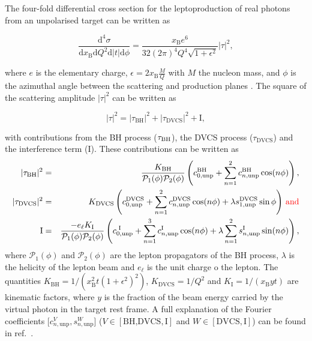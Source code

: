 The four-fold differential cross section for the leptoproduction of real photons
from an unpolarised target can be written as \cite{Bel02b}
\begin{center}
\begin{equation}
\frac{\textrm{d}^4\sigma}{\textrm{d}x_{\textrm{B}}\textrm{d}Q^{2}\textrm{d}
|t|\textrm{d}\phi} =
\frac{x_{\textrm{B}}e^{6}}{32(2\pi)^{4} Q^{4}\sqrt{1+\epsilon^{2}}}
|\tau|^{2},
\end{equation}
\end{center}
where $e$ is the elementary
charge, $\epsilon=2x_\textrm{B}\frac{M}{Q}$ with $M$
the nucleon mass, and $\phi$ is the
azimuthal angle between the scattering and production planes \cite{Tre04}.
The {square of the} scattering amplitude $|\tau|^2$ can be written as
\begin{center}
\begin{equation}
|\tau|^{2} = |\tau_{\textrm{BH}}|^{2} +
|\tau_{\textrm{DVCS}}|^{2} + \textrm{I},
\end{equation}
\end{center}
with contributions from the \textrm{BH} process ($\tau_{\textrm{\textrm{BH}}}$),
the DVCS process
($\tau_{\textrm{DVCS}}$) and the interference term (I). These
contributions can be written as
\begin{eqnarray}
 |\tau_{\textrm{BH}}|^{2} &=&
 \frac{K_{\textrm{BH}}}{\mathcal{P}_{1}(\phi)\mathcal{P}_{2}(\phi)} \left(c_{0,\textrm{unp}}^{\textrm{BH}} + \sum_{n=1}^2
  c_{n,\textrm{unp}}^{\textrm{BH}}\cos(n\phi)\right), \label{e:tbh}\\
|\tau_{\textrm{DVCS}}|^{2} &=&
K_{\textrm{DVCS}}\left(c_{0,\textrm{unp}}^{\textrm{DVCS}} +
\sum_{n=1}^2
c_{n,\textrm{unp}}^{\textrm{DVCS}}\cos(n\phi) + \lambda
s_{1,\textrm{unp}}^{\textrm{DVCS}}\sin\phi\right)\,{\color{red}{\textrm{and}}\color{black}}
\label{e:tdvcs}\\
 \textrm{I} &=& \frac{- e_\ell
K_{\textrm{I}}}{\mathcal{P}_{1}(\phi)\mathcal{P}_{2}(\phi)}\left(c_{0,\textrm{unp}}^{\textrm{
I}}+
\sum_{n=1}^3 c_{n,\textrm{unp}}^{\textrm{I}}\cos(n\phi) + \lambda \sum_{n=1}^2
s_{n,\textrm{unp}}^{\textrm{I}}\sin(n\phi)\right),\label{e:ti}
\end{eqnarray}
where $\mathcal{P}_1(\phi)$ and $\mathcal{P}_2(\phi)$ are the lepton propagators
of the BH process, $\lambda$ is the
helicity of the lepton beam and $e_\ell$ is the unit charge o
  the lepton.  The
quantities $K_{\textrm{BH}}=1/(x_\textrm{B}^2t(1+\epsilon^2)^2)$,
$K_{\textrm{DVCS}}=1/Q^2$
and $K_{\textrm{I}}=1/(x_{\textrm{B}}yt)$ are kinematic factors, where
$y$ is the fraction of the beam energy carried by the virtual photon in
the target rest frame. A full
explanation of the Fourier coefficients [$c_{n,\textrm{unp}}^V,s_{n,\textrm{unp}}^W$]
($V\in[\textrm{BH,DVCS},\textrm{I}]$ and $W\in[\textrm{DVCS},\textrm{I}]$) can be found in ref.~\cite{Bel02b}.
 
